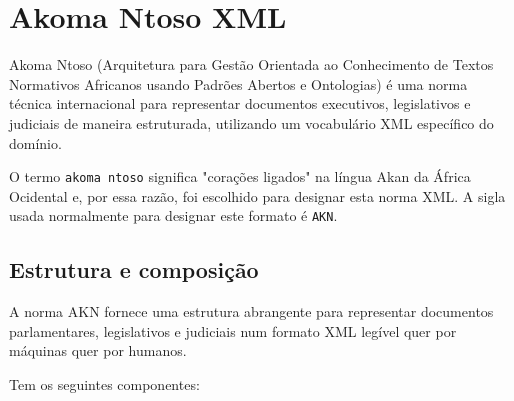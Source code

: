 \section{Akoma Ntoso XML}

Akoma Ntoso (Arquitetura para Gestão Orientada ao Conhecimento de Textos Normativos Africanos usando Padrões Abertos e Ontologias) 
é uma norma técnica internacional para representar documentos executivos, legislativos e judiciais de maneira estruturada, 
utilizando um vocabulário XML específico do domínio.

O termo \texttt{akoma ntoso} significa "corações ligados" na língua Akan da África Ocidental e, por essa razão, foi escolhido 
para designar esta norma XML. A sigla usada normalmente para designar este formato é \texttt{AKN}.

\subsection{Estrutura e composição}

A norma AKN fornece uma estrutura abrangente para representar documentos parlamentares, legislativos e judiciais 
num formato XML legível quer por máquinas quer por humanos. 

Tem os seguintes componentes:

